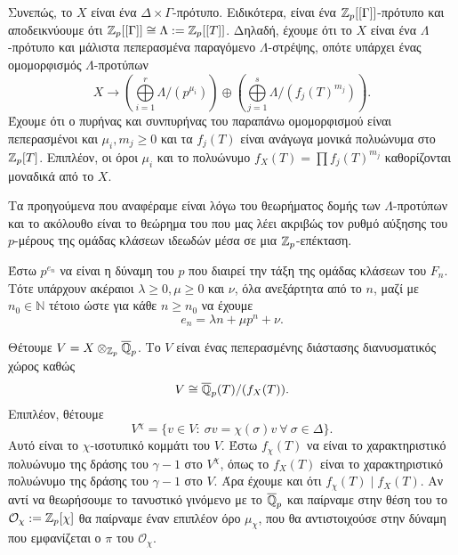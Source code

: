 \begin{figure}[H]
    \centering
\end{figure}

\noindent Συνεπώς, το $X$ είναι ένα $\Delta \times \Gamma$-πρότυπο. 
Ειδικότερα, είναι ένα $\mathbb{Z}_p [[\Gamma]]$-πρότυπο και αποδεικνύουμε ότι $\mathbb{Z}_p[[\Gamma]] \cong \Lambda := 
\mathbb{Z}_p [[T]]$. Δηλαδή, έχουμε ότι το $X$ είναι ένα $\Lambda$-πρότυπο και μάλιστα πεπερασμένα παραγόμενο $\Lambda$-στρέψης, οπότε υπάρχει ένας ομομορφισμός $\Lambda$-προτύπων
$$X \longrightarrow \left(\bigoplus\limits_{i=1}^r \Lambda/(p^{\mu_i})\right) \oplus \left(\bigoplus\limits_{j=1}^s 
\Lambda/(f_j(T)^{m_j})\right).$$ Έχουμε ότι ο πυρήνας και συνπυρήνας του παραπάνω ομομορφισμού είναι πεπερασμένοι 
και $\mu_i, m_j \geq 0$ και τα $f_j(T)$ είναι ανάγωγα μονικά πολυώνυμα στο $\mathbb{Z}_p[T]$. Επιπλέον, οι όροι $\mu_i$ και το πολυώνυμο $f_X(T) = \prod f_j(T)^{m_j}$ καθορίζονται μοναδικά από το $X$.

Τα προηγούμενα που αναφέραμε είναι λόγω του θεωρήματος δομής των $\Lambda$-προτύπων και το ακόλουθο είναι το θεώρημα του  που μας λέει ακριβώς τον ρυθμό αύξησης του $p$-μέρους της ομάδας κλάσεων ιδεωδών μέσα σε μια $\mathbb{Z}_p$-επέκταση.

\begin{theorem}[\tl{Iwasawa}]
        Έστω $p^{e_n}$ να είναι η δύναμη του $p$ που διαιρεί την τάξη της ομάδας κλάσεων του $F_n$. Τότε υπάρχουν ακέραιοι $\lambda \geq 0, \mu \geq 0$ και $\nu$, όλα ανεξάρτητα από το $n$, μαζί με $n_0 \in \mathbb{N}$ τέτοιο ώστε για κάθε $n\geq n_0$ να έχουμε
        $$e_n = \lambda n + \mu p^n + \nu .$$
\end{theorem}


\noindent Θέτουμε $V = X \otimes_{\mathbb{Z}_p} \overline{\mathbb{Q}}_p$. Το $V$ είναι ένας πεπερασμένης διάστασης διανυσματικός χώρος καθώς
$$V \cong \overline{\mathbb{Q}}_p(T)/(f_X(T)).$$ Επιπλέον, θέτουμε
$$V^\chi = \{v \in V: \ \sigma v = \chi(\sigma)v \ \forall \ \sigma \in \Delta \}.$$ Αυτό είναι το 
$\chi$-ισοτυπικό κομμάτι του $V$. Έστω $f_\chi(T)$ να είναι το χαρακτηριστικό πολυώνυμο της δράσης του $\gamma -1$ στο $V^\chi$, όπως το $f_X(T)$ είναι το χαρακτηριστικό πολυώνυμο της δράσης του $\gamma -1$ στο $V$. 
Άρα έχουμε και ότι $f_\chi (T) \mid f_X(T)$. Αν αντί να θεωρήσουμε το τανυστικό γινόμενο με το $\overline{\mathbb{Q}}_p$ και παίρναμε στην θέση του το $\mathcal{O}_\chi := \mathbb{Z}_p[\chi]$ θα παίρναμε έναν επιπλέον όρο $\mu_\chi$, που θα αντιστοιχούσε στην δύναμη που εμφανίζεται ο  $\pi$ του $\mathcal{O}_\chi$.

